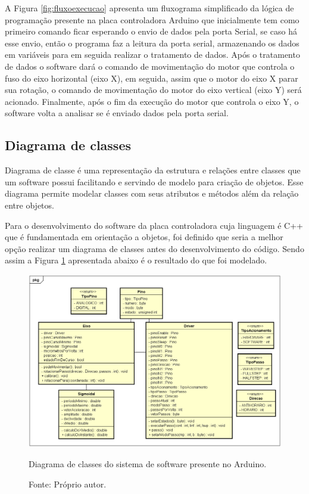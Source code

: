 A Figura \ref{fig:fluxoexecucao} apresenta um fluxograma simplificado da lógica de programação presente 
na placa controladora Arduino que inicialmente tem como primeiro comando ficar esperando o envio de 
dados pela porta Serial, se caso há esse envio, então o programa faz a leitura da porta serial, 
armazenando os dados em variáveis para em seguida realizar o tratamento de dados. Após o tratamento 
de dados o software dará o comando de movimentação do motor que controla o fuso do eixo horizontal 
(eixo X), em seguida, assim que o motor do eixo X parar sua rotação, o comando de movimentação 
do motor do eixo vertical (eixo Y) será acionado. Finalmente, após o fim da execução do motor 
que controla o eixo Y, o software volta a analisar se é enviado dados pela porta serial.

\subsection{Diagrama de classes}\label{subsec:metdiagrama}

Diagrama de classe é uma representação da estrutura e relações entre classes que um software possui 
facilitando e servindo de modelo para criação de objetos. Esse diagrama permite modelar classes com seus 
atributos e métodos além da relação entre objetos.

Para o desenvolvimento do software da placa controladora cuja linguagem é C++ que é fundamentada em 
orientação a objetos, foi definido que seria a melhor opção realizar um diagrama de classes antes do 
desenvolvimento do código. Sendo assim a Figura \ref{fig:diagramaclasses} apresentada abaixo é 
o resultado do que foi modelado.

\begin{landscape}
\begin{figure}[H]
\centering
\includegraphics[width = 0.8\linewidth]{figuras/diagramaclasses}
\caption{Diagrama de classes do sistema de software presente no Arduino.}
\caption*{Fonte: Próprio autor.}
\label{fig:diagramaclasses}
\end{figure}
\end{landscape}

